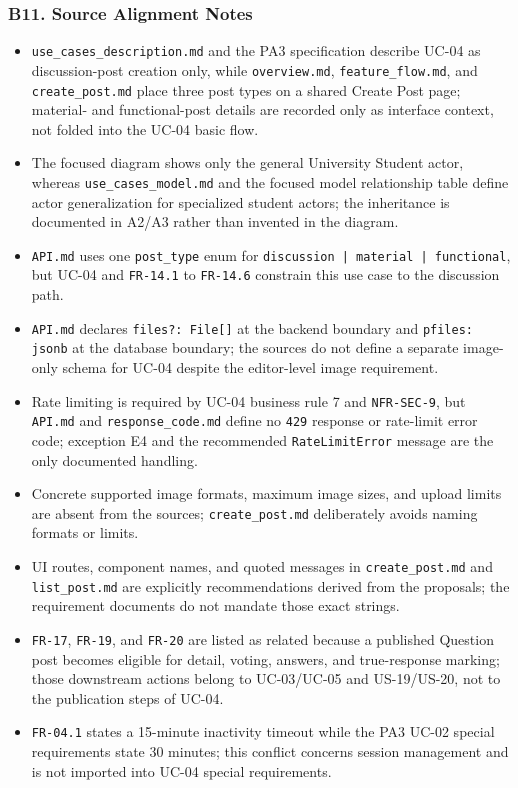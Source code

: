 \documentclass[12pt]{article}
\begin{document}
\hypertarget{sec:b11-source-alignment-notes}{}
\subsubsection*{B11. Source Alignment Notes}
\par\medskip

\begin{itemize}
\item \texttt{use\_cases\_description.md} and the PA3 specification describe UC-04 as discussion-post creation only, while \texttt{overview.md}, \texttt{feature\_flow.md}, and \texttt{create\_post.md} place three post types on a shared Create Post page; material- and functional-post details are recorded only as interface context, not folded into the UC-04 basic flow.
\item The focused diagram shows only the general University Student actor, whereas \texttt{use\_cases\_model.md} and the focused model relationship table define actor generalization for specialized student actors; the inheritance is documented in A2/A3 rather than invented in the diagram.
\item \texttt{API.md} uses one \texttt{post\_type} enum for \texttt{discussion | material | functional}, but UC-04 and \texttt{FR-14.1} to \texttt{FR-14.6} constrain this use case to the discussion path.
\item \texttt{API.md} declares \texttt{files?: File[]} at the backend boundary and \texttt{pfiles: jsonb} at the database boundary; the sources do not define a separate image-only schema for UC-04 despite the editor-level image requirement.
\item Rate limiting is required by UC-04 business rule 7 and \texttt{NFR-SEC-9}, but \texttt{API.md} and \texttt{response\_code.md} define no \texttt{429} response or rate-limit error code; exception E4 and the recommended \texttt{RateLimitError} message are the only documented handling.
\item Concrete supported image formats, maximum image sizes, and upload limits are absent from the sources; \texttt{create\_post.md} deliberately avoids naming formats or limits.
\item UI routes, component names, and quoted messages in \texttt{create\_post.md} and \texttt{list\_post.md} are explicitly recommendations derived from the proposals; the requirement documents do not mandate those exact strings.
\item \texttt{FR-17}, \texttt{FR-19}, and \texttt{FR-20} are listed as related because a published Question post becomes eligible for detail, voting, answers, and true-response marking; those downstream actions belong to UC-03/UC-05 and US-19/US-20, not to the publication steps of UC-04.
\item \texttt{FR-04.1} states a 15-minute inactivity timeout while the PA3 UC-02 special requirements state 30 minutes; this conflict concerns session management and is not imported into UC-04 special requirements.
\end{itemize}
\par\medskip
\end{document}
